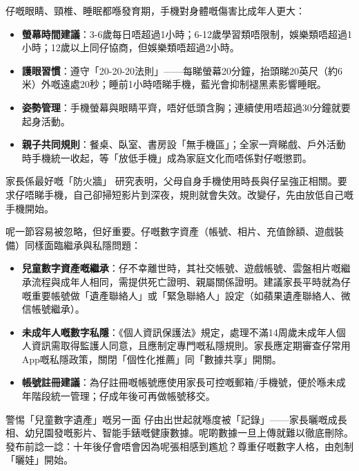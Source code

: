 
仔嘅眼睛、頸椎、睡眠都喺發育期，手機對身體嘅傷害比成年人更大：

\begin{itemize}
  \item \textbf{螢幕時間建議}：3-6歲每日唔超過1小時；6-12歲學習類唔限制，娛樂類唔超過1小時；12歲以上同仔協商，但娛樂類唔超過2小時。
  \item \textbf{護眼習慣}：遵守「20-20-20法則」——每睇螢幕20分鐘，抬頭睇20英尺（約6米）外嘅遠處20秒；睡前1小時唔睇手機，藍光會抑制褪黑素影響睡眠。
  \item \textbf{姿勢管理}：手機螢幕與眼睛平齊，唔好低頭含胸；連續使用唔超過30分鐘就要起身活動。
  \item \textbf{親子共同規則}：餐桌、臥室、書房設「無手機區」；全家一齊睇戲、戶外活動時手機統一收起，等「放低手機」成為家庭文化而唔係對仔嘅懲罰。
\end{itemize}

\begin{tcbinfo}{家長係最好嘅「防火牆」}
研究表明，父母自身手機使用時長與仔呈強正相關。要求仔唔睇手機，自己卻掃短影片到深夜，規則就會失效。改變仔，先由放低自己嘅手機開始。

\end{tcbinfo}


呢一節容易被忽略，但好重要。仔嘅數字資產（帳號、相片、充值餘額、遊戲裝備）同樣面臨繼承與私隱問題：

\begin{itemize}
  \item \textbf{兒童數字資產嘅繼承}：仔不幸離世時，其社交帳號、遊戲帳號、雲盤相片嘅繼承流程與成年人相同，需提供死亡證明、親屬關係證明。建議家長平時就為仔嘅重要帳號做「遺產聯絡人」或「緊急聯絡人」設定（如蘋果遺產聯絡人、微信帳號繼承）。
  \item \textbf{未成年人嘅數字私隱}：《個人資訊保護法》規定，處理不滿14周歲未成年人個人資訊需取得監護人同意，且應制定專門嘅私隱規則。家長應定期審查仔常用App嘅私隱政策，關閉「個性化推薦」同「數據共享」開關。
  \item \textbf{帳號註冊建議}：為仔註冊嘅帳號應使用家長可控嘅郵箱/手機號，便於喺未成年階段統一管理；仔成年後可再做帳號移交。
\end{itemize}

\begin{tcbwarn}{警惕「兒童數字遺產」嘅另一面}
仔由出世起就喺度被「記錄」——家長曬嘅成長相、幼兒園發嘅影片、智能手錶嘅健康數據。呢啲數據一旦上傳就難以徹底刪除。發布前諗一諗：十年後仔會唔會因為呢張相感到尷尬？尊重仔嘅數字人格，由剋制「曬娃」開始。

\end{tcbwarn}

